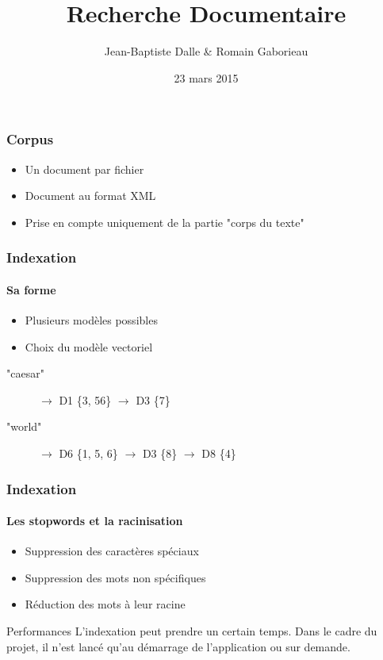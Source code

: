 \documentclass{beamer}
\title{Recherche Documentaire}
\author{Jean-Baptiste Dalle \& Romain Gaborieau}
\date{23 mars 2015}
\begin{document}
\maketitle

\begin{frame}

\frametitle{Corpus}

\begin{itemize}
 \item Un document par fichier
 \item Document au format XML
 \item Prise en compte uniquement de la partie "corps du texte"
\end{itemize}

 
\end{frame}

\begin{frame}

\frametitle{Indexation}
\framesubtitle{Sa forme}

\begin{itemize}
 \item Plusieurs mod\`eles possibles
 \item Choix du mod\`ele vectoriel
\end{itemize}


\begin{description}
 \item["caesar"] $\rightarrow$ D1 \{3, 56\} $\rightarrow$ D3 \{7\}
 \item["world"] $\rightarrow$ D6 \{1, 5, 6\} $\rightarrow$ D3 \{8\} $\rightarrow$ D8 \{4\}
\end{description}
 
\end{frame}

\begin{frame}

\frametitle{Indexation}
\framesubtitle{Les stopwords et la racinisation}

\begin{itemize}
 \item Suppression des caract\`eres sp\'eciaux
 \item Suppression des mots non sp\'ecifiques
 \item R\'eduction des mots \`a leur racine
\end{itemize}

\begin{block}{Performances}
 L'indexation peut prendre un certain temps. Dans le cadre du projet, il n'est lanc\'e qu'au d\'emarrage de l'application ou sur demande.
\end{block}

 
\end{frame}
\end{document}
